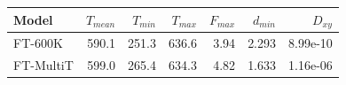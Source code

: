 \begin{tabular}{lrrrrrr}
\toprule
Model & $T_{mean}$ & $T_{min}$ & $T_{max}$ & $F_{max}$ & $d_{min}$ & $D_{xy}$\\
\midrule
FT-600K & 590.1 & 251.3 & 636.6 & 3.94 & 2.293 & 8.99e-10\\
FT-MultiT & 599.0 & 265.4 & 634.3 & 4.82 & 1.633 & 1.16e-06\\
\bottomrule
\end{tabular}
